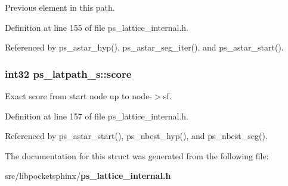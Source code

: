 Previous element in this path. 



Definition at line 155 of file ps\+\_\+lattice\+\_\+internal.\+h.



Referenced by ps\+\_\+astar\+\_\+hyp(), ps\+\_\+astar\+\_\+seg\+\_\+iter(), and ps\+\_\+astar\+\_\+start().

\subsubsection[{score}]{\setlength{\rightskip}{0pt plus 5cm}int32 ps\+\_\+latpath\+\_\+s\+::score}\label{structps__latpath__s_a9249fb528f754db992df1d494a69b580}


Exact score from start node up to node-\/$>$sf. 



Definition at line 157 of file ps\+\_\+lattice\+\_\+internal.\+h.



Referenced by ps\+\_\+astar\+\_\+start(), ps\+\_\+nbest\+\_\+hyp(), and ps\+\_\+nbest\+\_\+seg().



The documentation for this struct was generated from the following file\+:\begin{DoxyCompactItemize}
\item 
src/libpocketsphinx/{\bf ps\+\_\+lattice\+\_\+internal.\+h}\end{DoxyCompactItemize}
